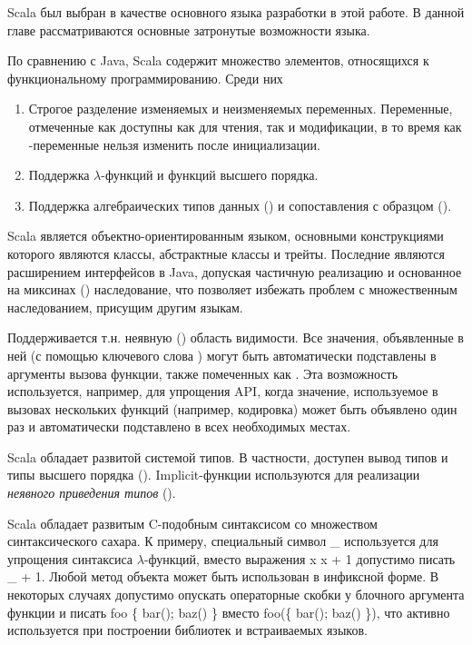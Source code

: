 Scala был выбран в качестве основного языка разработки в этой работе. В данной главе рассматриваются основные затронутые возможности языка.

По сравнению с Java, Scala содержит множество элементов, относящихся к функциональному программированию. Среди них
\begin{enumerate}
  \item Строгое разделение изменяемых и неизменяемых переменных. Переменные, отмеченные как \<\> доступны как для чтения, так и модификации, в то время как \<\>-переменные нельзя изменить после инициализации.
  \item Поддержка $\lambda$-функций и функций высшего порядка.
  \item Поддержка алгебраических типов данных () и сопоставления с образцом ().
\end{enumerate}

Scala является объектно-ориентированным языком, основными конструкциями которого являются классы, абстрактные классы и трейты. Последние являются расширением интерфейсов в Java, допуская частичную реализацию и основанное на миксинах () наследование, что позволяет избежать проблем с множественным наследованием, присущим другим языкам. 

Поддерживается т.н. неявную () область видимости. Все значения, объявленные в ней (с помощью ключевого слова \<\>) могут быть автоматически подставлены в аргументы вызова функции, также помеченных как \<\>. Эта возможность используется, например, для упрощения API, когда значение, используемое в вызовах нескольких функций (например, кодировка) может быть объявлено один раз и автоматически подставлено в всех необходимых местах.

Scala обладает развитой системой типов. В частности, доступен вывод типов и типы высшего порядка (). Implicit-функции используются для реализации \emph{неявного приведения типов} ().

Scala обладает развитым C-подобным синтаксисом со множеством синтаксического сахара. К примеру, специальный символ \<\_\> используется для упрощения синтаксиса $\lambda$-функций, вместо выражения \<x \Rightarrow x + 1\> допустимо писать \<\_ + 1\>. Любой метод объекта может быть использован в инфиксной форме. В некоторых случаях допустимо опускать операторные скобки у блочного аргумента функции и писать \<foo \{ bar(); baz() \}\> вместо \<foo(\{ bar(); baz() \})\>, что активно используется при построении библиотек и встраиваемых языков.

